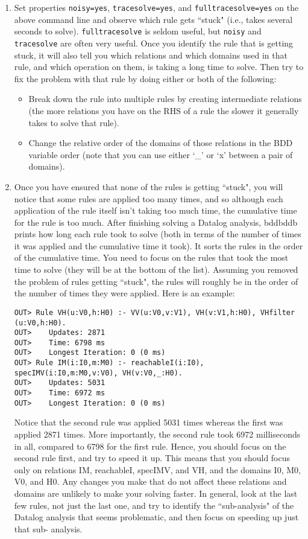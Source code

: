 \begin{enumerate}
\item
Set properties \verb+noisy=yes+, \verb+tracesolve=yes+, and \verb+fulltracesolve=yes+
on the above command line and observe which rule gets ``stuck" (i.e., takes several seconds to solve).
\verb+fulltracesolve+ is seldom useful, but \verb+noisy+ and \verb+tracesolve+ are
often very useful.  Once you identify the rule that is getting stuck, it
will also tell you which relations and which domains used in that rule,
and which operation on them, is taking a long time to solve.  Then try
to fix the problem with that rule by doing either or both of the following:
\begin{itemize}
\item
Break down the rule into multiple rules by creating intermediate relations (the more
relations you have on the RHS of a rule the slower it generally takes to solve
that rule).
\item
Change the relative order of the domains of those
relations in the BDD variable order
(note that you can use either `\_' or `x' between a pair of domains).
\end{itemize}

\item
Once you have ensured that none of the rules is getting ``stuck",
you will notice that some rules are applied too many times, and so
although each application of the rule itself isn't taking too much
time, the cumulative time for the rule is too much.  After finishing
solving a Datalog analysis, bddbddb prints how long each rule took to
solve (both in terms of the number of times it was applied and the
cumulative time it took).  It sorts the rules in the order of the
cumulative time.  You need to focus on the rules that took the most
time to solve (they will be at the bottom of the list).  Assuming you
removed the problem of rules getting ``stuck", the rules will roughly
be in the order of the number of times they were applied.  Here is an
example:

\begin{verbatim}
OUT> Rule VH(u:V0,h:H0) :- VV(u:V0,v:V1), VH(v:V1,h:H0), VHfilter
(u:V0,h:H0).
OUT>    Updates: 2871
OUT>    Time: 6798 ms
OUT>    Longest Iteration: 0 (0 ms)
OUT> Rule IM(i:I0,m:M0) :- reachableI(i:I0), specIMV(i:I0,m:M0,v:V0), VH(v:V0,_:H0).
OUT>    Updates: 5031
OUT>    Time: 6972 ms
OUT>    Longest Iteration: 0 (0 ms)
\end{verbatim}

Notice that the second rule was applied 5031 times whereas the first
was applied 2871 times.  More importantly, the second rule took 6972
milliseconds in all, compared to 6798 for the first rule.  Hence, you
should focus on the second rule first, and try to speed it up.  This
means that you should focus only on relations IM, reachableI, specIMV,
and VH, and the domains I0, M0, V0, and H0.  Any changes you make that
do not affect these relations and domains are unlikely to make your
solving faster.  In general, look at the last few rules, not just the
last one, and try to identify the ``sub-analysis" of the Datalog analysis
that seems problematic, and then focus on speeding up just that sub-
analysis.


\end{enumerate}
